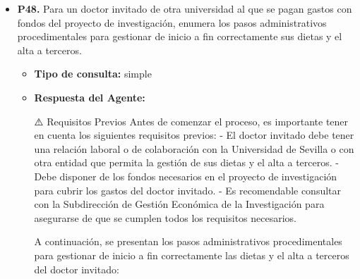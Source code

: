 \documentclass{article}
\begin{document}
\begin{itemize}
\begin{itemize}
\begin{scriptsize}
                  \# Cambio de la duración de la movilidad: ampliar o reducir

                  La reducción de la estancia sólo será autorizada en casos excepcionales y por motivos justificados con la previa presentación de la debida documentación que demuestre las circunstancias excepcionales y sobrevenidas durante el desarrollo de la estancia.

                  Una vez se haya informado a la Vicedecana de Movilidad e Internacionalización del interés de reducir la estancia y expuestos los motivos justificados y con el consentimiento de la

                  13
                \end{scriptsize}
        \end{itemize}


  \item \textbf{P48.} Para un doctor invitado de otra universidad al que se pagan gastos con fondos del proyecto de investigación, enumera los pasos administrativos procedimentales para gestionar de inicio a fin correctamente sus dietas y el alta a terceros. \\
        \begin{itemize}
          \item \textbf{Tipo de consulta:} simple
          \item \textbf{Respuesta del Agente:}

                ⚠️ Requisitos Previos
                Antes de comenzar el proceso, es importante tener en cuenta los siguientes requisitos previos:
                - El doctor invitado debe tener una relación laboral o de colaboración con la Universidad de Sevilla o con otra entidad que permita la gestión de sus dietas y el alta a terceros.
                - Debe disponer de los fondos necesarios en el proyecto de investigación para cubrir los gastos del doctor invitado.
                - Es recomendable consultar con la Subdirección de Gestión Económica de la Investigación para asegurarse de que se cumplen todos los requisitos necesarios.

                A continuación, se presentan los pasos administrativos procedimentales para gestionar de inicio a fin correctamente las dietas y el alta a terceros del doctor invitado:


\end{itemize}
\end{itemize}
\end{document}
